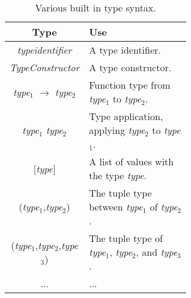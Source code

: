 \begin{table}[h]
    \centering
    \begin{tabular}{c|p{0.6\linewidth}}
        Type & Use \\\hline
        {\it typeidentifier} & A type identifier.\\
        {\it TypeConstructor} & A type constructor.\\
        {\it type$_1$} $\rightarrow$ {\it type$_2$} & Function type from {\it type$_1$} to {\it type$_2$}.\\
        {\it type$_1$} {\it type$_2$} & Type application, applying {\it type$_2$} to {\it type$_1$}.\\
        $[${\it type}$]$ & A list of values with the type {\it type}.\\
        ({\it type$_1$},{\it type$_2$}) & The tuple type between {\it type$_1$} of {\it type$_2$}.\\
        ({\it type$_1$},{\it type$_2$},{\it type$_3$}) & The tuple type of {\it type$_1$}, {\it type$_2$}, and {\it type$_3$}.\\
        ... & ...
    \end{tabular}
    \caption{Various built in type syntax.}
    \label{tab:type-constructs}
\end{table}